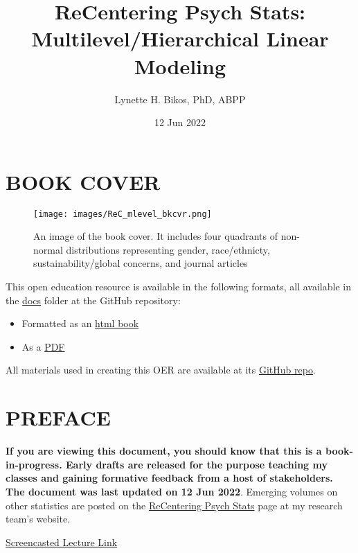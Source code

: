 \documentclass[
  11pt,
]{book}
\title{ReCentering Psych Stats: Multilevel/Hierarchical Linear Modeling}
\author{Lynette H. Bikos, PhD, ABPP}
\date{12 Jun 2022}
\providecommand{\tightlist}{%
  \setlength{\itemsep}{0pt}\setlength{\parskip}{0pt}}
\begin{document}
\maketitle

{
\hypersetup{linkcolor=}
\setcounter{tocdepth}{1}
\tableofcontents
}
\hypertarget{book-cover}{%
\chapter*{BOOK COVER}\label{book-cover}}

\begin{figure}
\centering
\texttt{[image: images/ReC\_mlevel\_bkcvr.png]}
\caption{An image of the book cover. It includes four quadrants of non-normal distributions representing gender, race/ethnicty, sustainability/global concerns, and journal articles}
\end{figure}

This open education resource is available in the following formats, all available in the \href{https://github.com/lhbikos/ReC_MultivModel/tree/main/docs}{docs} folder at the GitHub repository:

\begin{itemize}
\tightlist
\item
  Formatted as an \href{https://lhbikos.github.io/MultilevelModeling/}{html book}
\item
  As a \href{https://github.com/lhbikos/MultilevelModeling/blob/main/ReC_Multilevel.pdf}{PDF}
\end{itemize}

All materials used in creating this OER are available at its \href{https://github.com/lhbikos/MultilevelModeling}{GitHub repo}.

\hypertarget{preface}{%
\chapter*{PREFACE}\label{preface}}

\textbf{If you are viewing this document, you should know that this is a book-in-progress. Early drafts are released for the purpose teaching my classes and gaining formative feedback from a host of stakeholders. The document was last updated on 12 Jun 2022}. Emerging volumes on other statistics are posted on the \href{https://lhbikos.github.io/BikosRVT/ReCenter.html}{ReCentering Psych Stats} page at my research team's website.

\href{https://spu.hosted.panopto.com/Panopto/Pages/Viewer.aspx?id=c932455e-ef06-444a-bdca-acf7012d759a}{Screencasted Lecture Link}
\end{document}
